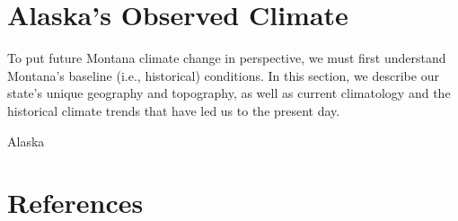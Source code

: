 \documentclass[
  letterpaper,
]{scrreprt}\usepackage{amsmath,amssymb}
\newlength{\cslhangindent}
\newlength{\cslentryspacingunit} %
\newenvironment{CSLReferences}[2] %
 {%
  \setlength{\parindent}{0pt}
  \ifodd #1
  \let\oldpar\par
  \def\par{\hangindent=\cslhangindent\oldpar}
  \fi
  \setlength{\parskip}{#2\cslentryspacingunit}
 }%
 {}
\begin{document}
\hypertarget{alaskas-observed-climate}{%
\chapter{Alaska's Observed Climate}\label{alaskas-observed-climate}}

To put future Montana climate change in perspective, we must first
understand Montana's baseline (i.e., historical) conditions. In this
section, we describe our state's unique geography and topography, as
well as current climatology and the historical climate trends that have
led us to the present day.

Alaska

\hypertarget{references}{%
\chapter*{References}\label{references}}

\hypertarget{refs}{}
\begin{CSLReferences}{0}{0}
\end{CSLReferences}
\end{document}
